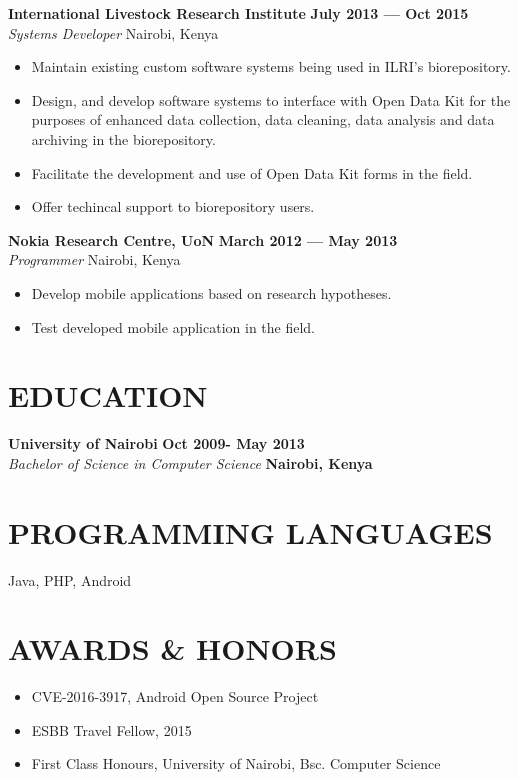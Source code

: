 \documentclass{res}
\begin{document}
\begin{resume}
\textbf{International Livestock Research Institute} \hfill        \textbf{July 2013 --- Oct 2015} \\
\emph{Systems Developer}       \hfill   Nairobi, Kenya
   \begin{itemize} \itemsep -2pt %
	\item Maintain existing custom software systems being used in ILRI’s biorepository.
	\item Design, and develop software systems to interface with Open Data Kit for the purposes of enhanced data collection, data cleaning, data analysis and data archiving in the biorepository.
	\item Facilitate the development and use of Open Data Kit forms in the field.
           \item Offer techincal support to biorepository users.
 \end{itemize} \vspace{-4pt}

\textbf{Nokia Research Centre, UoN} \hfill \textbf{March 2012 --- May 2013} \\
\emph{Programmer} \hfill Nairobi, Kenya
 \begin{itemize} \itemsep -2pt
  \item  Develop mobile applications based on research hypotheses.
   \item Test developed mobile application in the field.
    \end{itemize} \vspace{-6pt}


\section{EDUCATION}
\vspace{8pt}
\textbf{University of Nairobi}  \hfill \textbf{Oct 2009- May 2013} \\
\emph{Bachelor of Science in Computer Science} \hfill \textbf{Nairobi, Kenya}

\section{PROGRAMMING LANGUAGES}
\begin{itemize} \itemsep -2pt
\vspace {8pt}
Java, PHP, Android
\end{itemize}

\section{AWARDS \& HONORS}
\begin{itemize} \itemsep -2pt
\item CVE-2016-3917, Android Open Source Project
\item ESBB Travel Fellow, 2015
\item First Class Honours, University of Nairobi, Bsc. Computer Science
\end{itemize}


\end{resume}
\end{document}
